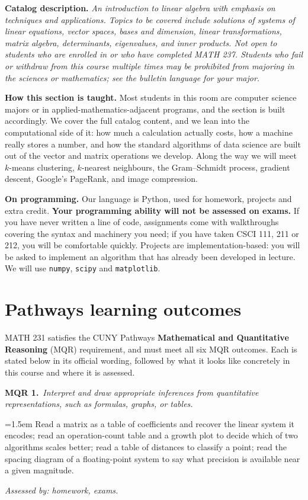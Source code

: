 \documentclass[11pt]{article}
\newcommand{\mqr}[4]{%
  \par\medskip\needspace{4\baselineskip}%
  {\bfseries\color{accent}MQR #1.}\ \emph{#2}\par\nobreak\vspace{0.2em}
  \begingroup\leftskip=1.5em\relax
  #3\par\nobreak\vspace{0.15em}
  {\footnotesize\itshape Assessed by: #4.}\par
  \endgroup}
\begin{document}
\textbf{Catalog description.} \emph{An introduction to linear algebra with
emphasis on techniques and applications. Topics to be covered include solutions
of systems of linear equations, vector spaces, bases and dimension, linear
transformations, matrix algebra, determinants, eigenvalues, and inner products.
Not open to students who are enrolled in or who have completed MATH 237.
Students who fail or withdraw from this course multiple times may be prohibited
from majoring in the sciences or mathematics; see the bulletin language for
your major.}

\textbf{How this section is taught.} Most students in this room are computer
science majors or in applied-mathematics-adjacent programs, and the section is
built accordingly. We cover the full catalog content, and we lean into the
computational side of it: how much a calculation actually costs, how a machine
really stores a number, and how the standard algorithms of data science are
built out of the vector and matrix operations we develop. Along the way we will
meet $k$-means clustering, $k$-nearest neighbours, the Gram--Schmidt process,
gradient descent, Google's PageRank, and image compression.

\textbf{On programming.} Our language is Python, used for homework, projects
and extra credit. \textbf{Your programming ability will not be assessed on
exams.} If you have never written a line of code, assignments come with
walkthroughs covering the syntax and machinery you need; if you have taken
CSCI 111, 211 or 212, you will be comfortable quickly. Projects are
implementation-based: you will be asked to implement an algorithm that has
already been developed in lecture. We will use \texttt{numpy}, \texttt{scipy}
and \texttt{matplotlib}.

\section{Pathways learning outcomes}

MATH 231 satisfies the CUNY Pathways \textbf{Mathematical and Quantitative
Reasoning} (MQR) requirement, and must meet all six MQR outcomes. Each is
stated below in its official wording, followed by what it looks like concretely
in this course and where it is assessed.

\mqr{1}{Interpret and draw appropriate inferences from quantitative
  representations, such as formulas, graphs, or tables.}
 {Read a matrix as a table of coefficients and recover the linear system it
  encodes; read an operation-count table and a growth plot to decide which of
  two algorithms scales better; read a table of distances to classify a point;
  read the spacing diagram of a floating-point system to say what precision is
  available near a given magnitude.}
 {homework, exams}
\end{document}
